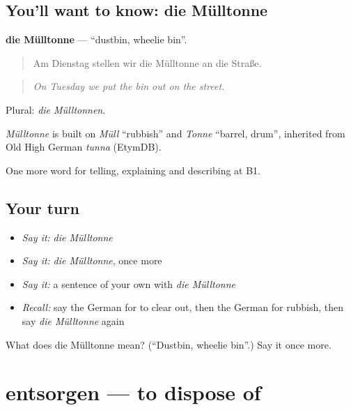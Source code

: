 \subsection*{You'll want to know: die Mülltonne}
\textbf{die Mülltonne} — \textquotedblleft{}dustbin, wheelie bin\textquotedblright{}.

\begin{quote}
Am Dienstag stellen wir die Mülltonne an die Straße.
\end{quote}

\begin{quote}
\emph{On Tuesday we put the bin out on the street.}
\end{quote}

Plural: \emph{die Mülltonnen}.

\begin{cousinweb}
\emph{Mülltonne} is built on \emph{Müll} \textquotedblleft{}rubbish\textquotedblright{} and \emph{Tonne} \textquotedblleft{}barrel, drum\textquotedblright{}, inherited from Old High German \emph{tunna} (EtymDB).
\end{cousinweb}

\begin{grammarlens}[title={What you've built}]
One more word for telling, explaining and describing at B1.
\end{grammarlens}

\subsection*{Your turn}
\begin{itemize}
\raggedright
  \item \emph{Say it:} \emph{die Mülltonne}
  \item \emph{Say it:} \emph{die Mülltonne}, once more
  \item \emph{Say it:} a sentence of your own with \emph{die Mülltonne}
  \item \emph{Recall:} say the German for to clear out, then the German for rubbish, then say \emph{die Mülltonne} again
\end{itemize}

\begin{tcolorbox}[breakable,colback=teal!4,colframe=teal!35!black,title={Before you move on}]
What does die Mülltonne mean? (\textquotedblleft{}Dustbin, wheelie bin\textquotedblright{}.) Say it once more.
\end{tcolorbox}
\section[entsorgen]{entsorgen — to dispose of}

